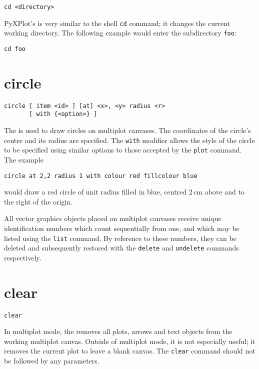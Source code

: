 \begin{verbatim}
cd <directory>
\end{verbatim}

PyXPlot's  is very similar to the shell {\tt cd} command; it
changes the current working directory. The following example would enter the
subdirectory {\tt foo}:

\begin{verbatim}
cd foo
\end{verbatim}


\section{circle}

\begin{verbatim}
circle [ item <id> ] [at] <x>, <y> radius <r>
       [ with {<option>} ]
\end{verbatim}

The  is used to draw circles on multiplot canvases.  The
coordinates of the circle's centre and its radius are specified. The {\tt with}
modifier allows the style of the circle to be specified using similar options
to those accepted by the {\tt plot} command.  The example

\begin{verbatim}
circle at 2,2 radius 1 with colour red fillcolour blue
\end{verbatim}

\noindent would draw a red circle of unit radius filled in blue, centred
$2\,\mathrm{cm}$ above and to the right of the origin.

All vector graphics objects placed on multiplot canvases receive unique
identification numbers which count sequentially from one, and which may be
listed using the {\tt list} command.  By reference to these numbers, they can
be deleted and subsequently restored with the {\tt delete} and {\tt undelete}
commands respectively.


\section{clear}

\begin{verbatim}
clear
\end{verbatim}

In multiplot mode, the  removes all plots, arrows and text
objects from the working multiplot canvas. Outside of multiplot mode, it is not
especially useful; it removes the current plot to leave a blank canvas.  The
{\tt clear} command should not be followed by any parameters.


